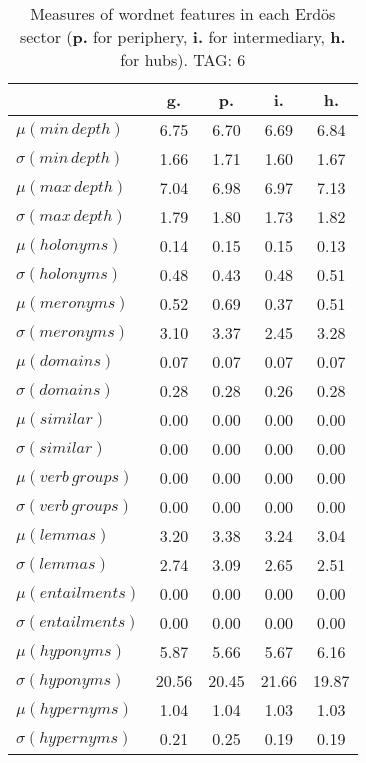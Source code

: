 \begin{table}[h!]
\begin{center}
\begin{tabular}{| l || c | c | c | c |}\hline
 & {\bf g.} & {\bf p.} & {\bf i.} & {\bf h.} \\\hline\hline
$\mu(min\,depth)$ & 6.75  & 6.70  & 6.69  & 6.84 \\
$\sigma(min\,depth)$ & 1.66  & 1.71  & 1.60  & 1.67 \\\hline
$\mu(max\,depth)$ & 7.04  & 6.98  & 6.97  & 7.13 \\
$\sigma(max\,depth)$ & 1.79  & 1.80  & 1.73  & 1.82 \\\hline
$\mu(holonyms)$ & 0.14  & 0.15  & 0.15  & 0.13 \\
$\sigma(holonyms)$ & 0.48  & 0.43  & 0.48  & 0.51 \\\hline
$\mu(meronyms)$ & 0.52  & 0.69  & 0.37  & 0.51 \\
$\sigma(meronyms)$ & 3.10  & 3.37  & 2.45  & 3.28 \\\hline
$\mu(domains)$ & 0.07  & 0.07  & 0.07  & 0.07 \\
$\sigma(domains)$ & 0.28  & 0.28  & 0.26  & 0.28 \\\hline
$\mu(similar)$ & 0.00  & 0.00  & 0.00  & 0.00 \\
$\sigma(similar)$ & 0.00  & 0.00  & 0.00  & 0.00 \\\hline
$\mu(verb\,groups)$ & 0.00  & 0.00  & 0.00  & 0.00 \\
$\sigma(verb\,groups)$ & 0.00  & 0.00  & 0.00  & 0.00 \\\hline
$\mu(lemmas)$ & 3.20  & 3.38  & 3.24  & 3.04 \\
$\sigma(lemmas)$ & 2.74  & 3.09  & 2.65  & 2.51 \\\hline
$\mu(entailments)$ & 0.00  & 0.00  & 0.00  & 0.00 \\
$\sigma(entailments)$ & 0.00  & 0.00  & 0.00  & 0.00 \\\hline
$\mu(hyponyms)$ & 5.87  & 5.66  & 5.67  & 6.16 \\
$\sigma(hyponyms)$ & 20.56  & 20.45  & 21.66  & 19.87 \\\hline
$\mu(hypernyms)$ & 1.04  & 1.04  & 1.03  & 1.03 \\
$\sigma(hypernyms)$ & 0.21  & 0.25  & 0.19  & 0.19 \\\hline
\end{tabular}
\caption{Measures of wordnet features in each Erd\"os sector ({{\bf p.}} for periphery, {{\bf i.}} for intermediary, {{\bf h.}} for hubs). TAG: 6}
\end{center}
\end{table}